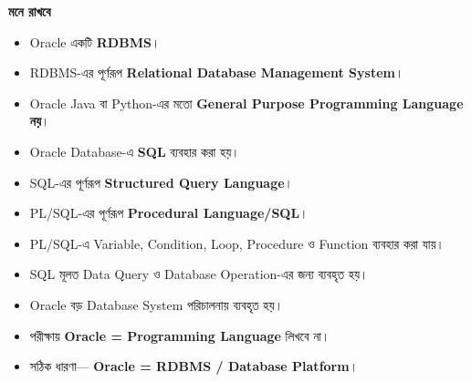 \begin{rememberbox}

\textbf{\color{deepOrange}মনে রাখবে}

\begin{itemize}

\item Oracle একটি \textbf{RDBMS}।

\item RDBMS-এর পূর্ণরূপ
\textbf{Relational Database Management System}।

\item Oracle Java বা Python-এর মতো
\textbf{General Purpose Programming Language নয়}।

\item Oracle Database-এ \textbf{SQL} ব্যবহার করা হয়।

\item SQL-এর পূর্ণরূপ
\textbf{Structured Query Language}।

\item PL/SQL-এর পূর্ণরূপ
\textbf{Procedural Language/SQL}।

\item PL/SQL-এ Variable, Condition, Loop, Procedure ও Function
ব্যবহার করা যায়।

\item SQL মূলত Data Query ও Database Operation-এর জন্য ব্যবহৃত হয়।

\item Oracle বড় Database System পরিচালনায় ব্যবহৃত হয়।
\item পরীক্ষায়
\textbf{Oracle = Programming Language}
লিখবে না।

\item সঠিক ধারণা—
\textbf{Oracle = RDBMS / Database Platform}।

\end{itemize}

\end{rememberbox}

\small

